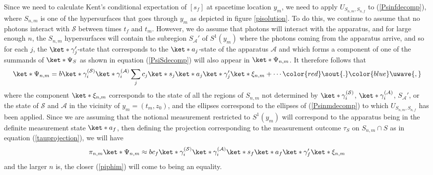 \documentclass[12pt]{report}
\providecommand{\DIFadd}[1]{{\protect\color{blue}\uwave{#1}}} %
\providecommand{\DIFdel}[1]{{\protect\color{red}\sout{#1}}}                      %
\providecommand{\DIFaddbegin}{} %
\providecommand{\DIFaddend}{} %
\providecommand{\DIFdelbegin}{} %
\providecommand{\DIFdelend}{} %
\begin{document}
Since we need to calculate Kent's conditional expectation of $[s_f]$ at spacetime location $y_m$, we need to apply  $U_{S_{n,m},S_{n,f}}$ to (\ref{Psinfdecomp}), where $S_{n,m}$ %
\DIFdelbegin %
\DIFdelend \DIFaddbegin {}\DIFaddend %
 is one of the hypersurfaces that goes through $y_m$ as depicted in figure \ref{pisolution}. To do this, we continue to assume that no photons interact with $\mathcal{S}$ between times $t_f$ and $t_m$. However, we do assume that photons will interact with the apparatus, and for large enough $n$, the $S_{n,m}$ hypersurfaces will contain the subregion $S_{\mathcal{A}}'$ of $S^1(y_m)$ where the photons coming from the apparatus arrive, and so for each $j$, the $\ket*{\gamma_j'}$-state %
%
 that corresponds to the $\ket*{a_j}$-state of the apparatus $\mathcal{A}$ and which forms a component of one of the summands of $\ket*{\Psi_S}$ as shown in equation (\ref{PsiSdecomp}) will also appear in $\ket*{\Psi_{n,m}}$. It therefore follows that 
\begin{equation}\label{Psinmdecomp}
	\ket*{\Psi_{n,m}}=b\ket*{\gamma_i^{(\mathcal{S})}}\ket*{\gamma_i^{(\mathcal{A})}}\sum_j c_j \ket*{s_j}\ket*{a_j}\ket*{\gamma_j'}\ket*{\xi_{n,m}}+\cdots\DIFdelbegin \DIFdel{.
}\DIFdelend \DIFaddbegin \DIFadd{,
}\DIFaddend \end{equation} 
where the component $\ket*{\xi_{n,m}}$ %
%
 corresponds to the state of all the regions of $S_{n,m}$ not determined by $\ket*{\gamma_i^{(\mathcal{S})}}$, $\ket*{\gamma_i^{(\mathcal{A})}}$,  $S_{\mathcal{A}}'$, or the state of $\mathcal{S}$ and $\mathcal{A}$ in the vicinity of $y_m=(t_m, z_0)$, and the ellipses correspond to the ellipses of (\ref{Psinmdecomp}) to which $U_{S_{n,m},S_{n,f}}$ has been applied. Since we are assuming that the notional measurement restricted to $S^1(y_m)$ will correspond to the apparatus being in the definite measurement state $\ket*{a_f}$, then defining the projection corresponding to the measurement outcome $\tau_S$ on $S_{n,m}\cap S$ as in equation (\ref{tauprojection}), we will have
\begin{equation}\label{piphim}
\pi_{n,m}\ket*{\Psi_{n,m}}\approx b c_f \ket*{\gamma_i^{(\mathcal{S})}}\ket*{\gamma_i^{(\mathcal{A})}}\ket*{s_f}\ket*{a_f}\ket*{\gamma_f'}\ket*{\xi_{n,m}}
\end{equation}
and the larger $n$ is, the closer (\ref{piphim}) will come to being an equality. 
\end{document}
